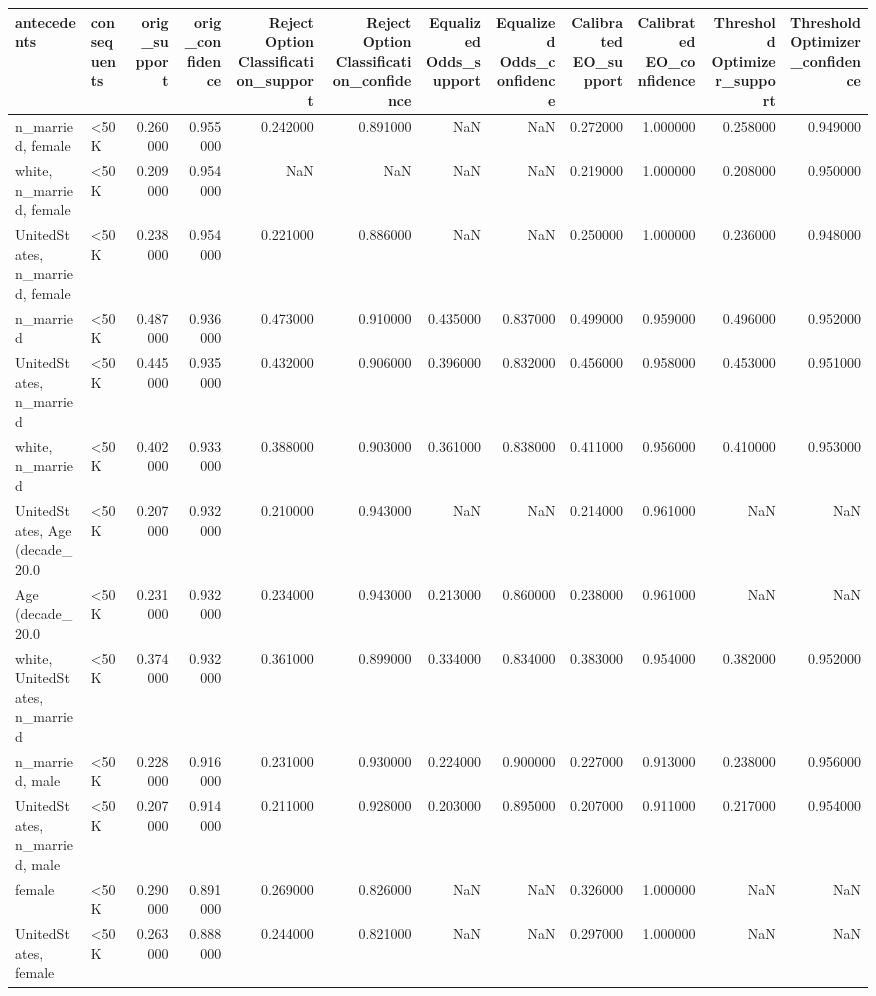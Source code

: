 \begin{tabular}{llrrrrrrrrrr}
\toprule
antecedents & consequents & orig_support & orig_confidence & Reject Option Classification_support & Reject Option Classification_confidence & Equalized Odds_support & Equalized Odds_confidence & Calibrated EO_support & Calibrated EO_confidence & Threshold Optimizer_support & Threshold Optimizer_confidence \\
\midrule
n_married, female & <50K & 0.260000 & 0.955000 & 0.242000 & 0.891000 & NaN & NaN & 0.272000 & 1.000000 & 0.258000 & 0.949000 \\
white, n_married, female & <50K & 0.209000 & 0.954000 & NaN & NaN & NaN & NaN & 0.219000 & 1.000000 & 0.208000 & 0.950000 \\
UnitedStates, n_married, female & <50K & 0.238000 & 0.954000 & 0.221000 & 0.886000 & NaN & NaN & 0.250000 & 1.000000 & 0.236000 & 0.948000 \\
n_married & <50K & 0.487000 & 0.936000 & 0.473000 & 0.910000 & 0.435000 & 0.837000 & 0.499000 & 0.959000 & 0.496000 & 0.952000 \\
UnitedStates, n_married & <50K & 0.445000 & 0.935000 & 0.432000 & 0.906000 & 0.396000 & 0.832000 & 0.456000 & 0.958000 & 0.453000 & 0.951000 \\
white, n_married & <50K & 0.402000 & 0.933000 & 0.388000 & 0.903000 & 0.361000 & 0.838000 & 0.411000 & 0.956000 & 0.410000 & 0.953000 \\
UnitedStates, Age (decade_20.0 & <50K & 0.207000 & 0.932000 & 0.210000 & 0.943000 & NaN & NaN & 0.214000 & 0.961000 & NaN & NaN \\
Age (decade_20.0 & <50K & 0.231000 & 0.932000 & 0.234000 & 0.943000 & 0.213000 & 0.860000 & 0.238000 & 0.961000 & NaN & NaN \\
white, UnitedStates, n_married & <50K & 0.374000 & 0.932000 & 0.361000 & 0.899000 & 0.334000 & 0.834000 & 0.383000 & 0.954000 & 0.382000 & 0.952000 \\
n_married, male & <50K & 0.228000 & 0.916000 & 0.231000 & 0.930000 & 0.224000 & 0.900000 & 0.227000 & 0.913000 & 0.238000 & 0.956000 \\
UnitedStates, n_married, male & <50K & 0.207000 & 0.914000 & 0.211000 & 0.928000 & 0.203000 & 0.895000 & 0.207000 & 0.911000 & 0.217000 & 0.954000 \\
female & <50K & 0.290000 & 0.891000 & 0.269000 & 0.826000 & NaN & NaN & 0.326000 & 1.000000 & NaN & NaN \\
UnitedStates, female & <50K & 0.263000 & 0.888000 & 0.244000 & 0.821000 & NaN & NaN & 0.297000 & 1.000000 & NaN & NaN \\

\end{tabular}
